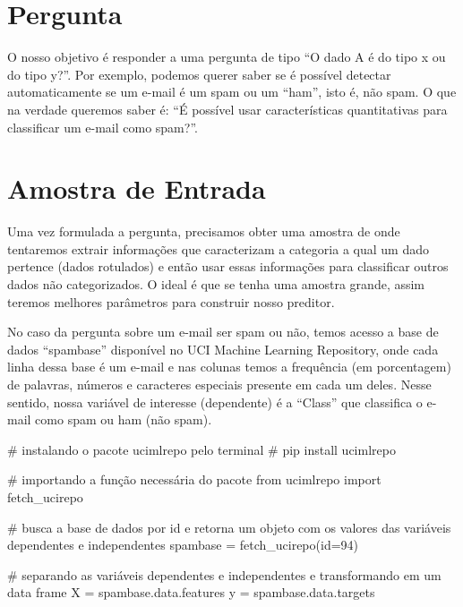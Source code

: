 \documentclass[
  letterpaper,
  DIV=11,
  numbers=noendperiod]{scrreprt}
\newenvironment{Shaded}{\begin{snugshade}}{\end{snugshade}}
\newcommand{\BuiltInTok}[1]{\textcolor[rgb]{0.00,0.23,0.31}{#1}}
\newcommand{\CommentTok}[1]{\textcolor[rgb]{0.37,0.37,0.37}{#1}}
\newcommand{\DecValTok}[1]{\textcolor[rgb]{0.68,0.00,0.00}{#1}}
\newcommand{\ImportTok}[1]{\textcolor[rgb]{0.00,0.46,0.62}{#1}}
\newcommand{\NormalTok}[1]{\textcolor[rgb]{0.00,0.23,0.31}{#1}}
\newcommand{\OperatorTok}[1]{\textcolor[rgb]{0.37,0.37,0.37}{#1}}
\begin{document}

\hypertarget{pergunta}{%
\chapter{Pergunta}\label{pergunta}}

O nosso objetivo é responder a uma pergunta de tipo ``O dado A é do tipo
x ou do tipo y?''. Por exemplo, podemos querer saber se é possível
detectar automaticamente se um e-mail é um spam ou um ``ham'', isto é,
não spam. O que na verdade queremos saber é: ``É possível usar
características quantitativas para classificar um e-mail como spam?''.


\hypertarget{amostra-de-entrada}{%
\chapter{Amostra de Entrada}\label{amostra-de-entrada}}

Uma vez formulada a pergunta, precisamos obter uma amostra de onde
tentaremos extrair informações que caracterizam a categoria a qual um
dado pertence (dados rotulados) e então usar essas informações para
classificar outros dados não categorizados. O ideal é que se tenha uma
amostra grande, assim teremos melhores parâmetros para construir nosso
preditor.

No caso da pergunta sobre um e-mail ser spam ou não, temos acesso a base
de dados ``spambase'' disponível no UCI Machine Learning Repository,
onde cada linha dessa base é um e-mail e nas colunas temos a frequência
(em porcentagem) de palavras, números e caracteres especiais presente em
cada um deles. Nesse sentido, nossa variável de interesse (dependente) é
a ``Class'' que classifica o e-mail como spam ou ham (não spam).

\begin{Shaded}
\begin{Highlighting}[]
\CommentTok{\# instalando o pacote ucimlrepo pelo terminal}
\CommentTok{\# pip install ucimlrepo}
\end{Highlighting}
\end{Shaded}

\begin{Shaded}
\begin{Highlighting}[]
\CommentTok{\# importando a função necessária do pacote}
\ImportTok{from}\NormalTok{ ucimlrepo }\ImportTok{import}\NormalTok{ fetch\_ucirepo }
  
\CommentTok{\# busca a base de dados por id e retorna um objeto com os valores das variáveis dependentes e independentes}
\NormalTok{spambase }\OperatorTok{=}\NormalTok{ fetch\_ucirepo(}\BuiltInTok{id}\OperatorTok{=}\DecValTok{94}\NormalTok{) }
  
\CommentTok{\# separando as variáveis dependentes e independentes e transformando em um data frame }
\NormalTok{X }\OperatorTok{=}\NormalTok{ spambase.data.features }
\NormalTok{y }\OperatorTok{=}\NormalTok{ spambase.data.targets }
\end{Highlighting}
\end{Shaded}
\end{document}
